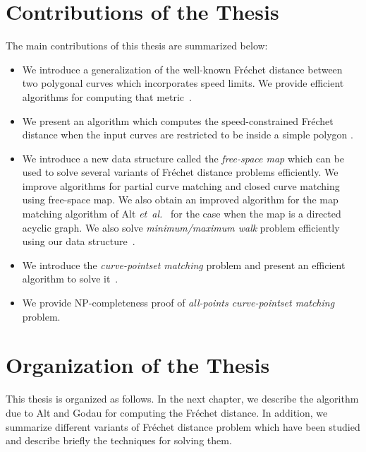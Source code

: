 \documentclass[12pt]{dalthesis}
\newcommand{\etal}{{\em et~al.\/}}
\newcommand{\Frechet}{Fr\'echet }
\begin{document}
\section{Contributions of the Thesis}

The main contributions of this thesis are summarized below: 
\begin{itemize}
\item We introduce a generalization of the well-known \Frechet 
distance between two polygonal curves which incorporates speed limits. 
We provide efficient 
algorithms for computing that metric~\cite{oursCCCG2009,oursSpeedJournal}.

\item We present an algorithm which computes 
the speed-constrained \Frechet distance when the
input curves are restricted to be inside a simple polygon \cite{oursCCCG2010}.

\item We introduce a new data structure called  
the \emph{free-space map} which can be used to solve several variants of 
\Frechet distance problems efficiently.
We improve algorithms for partial curve matching and
closed curve matching  using free-space map. 
We also obtain an improved algorithm for
the map matching algorithm of Alt \etal~\cite{AltERW03a}
for the case when the map is a directed acyclic graph.
We also solve \emph{minimum/maximum walk} problem efficiently using
our data structure~\cite{oursESA2011,oursPartialAlgorithmica}. 

\item We introduce the \emph{curve-pointset matching} problem and present 
an efficient algorithm to solve it~\cite{oursCCCG2011}. 

\item We provide NP-completeness proof of \emph{all-points curve-pointset matching} problem.

\end{itemize}


\section{Organization of the Thesis}

This thesis is organized as follows. In the next chapter, 
we describe the algorithm due to Alt and Godau \cite{AltG95} 
for computing the \Frechet distance. In addition, we summarize different variants of \Frechet distance problem 
which have been studied and
describe briefly the techniques for solving them.
\end{document}
